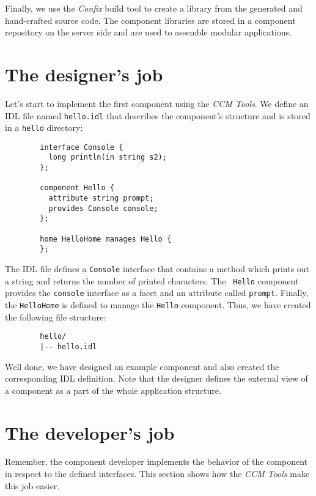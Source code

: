 Finally, we use the {\it Confix} build tool to create a library from the
generated and hand-crafted source code. The component libraries are stored in a
component repository on the server side and are used to assemble modular
applications.


\section{The designer's job}

Let's start to implement the first component using the {\it CCM Tools}. We
define an IDL file named {\tt hello.idl} that describes the component's
structure and is stored in a {\tt hello} directory:
\begin{verbatim}
        interface Console {
          long println(in string s2);
        };

        component Hello {
          attribute string prompt;	
          provides Console console;
        };

        home HelloHome manages Hello {
        };
\end{verbatim}

The IDL file defines a {\tt Console} interface that contains a method which
prints out a string and returns the number of printed characters. The {\tt
Hello} component provides the {\tt console} interface as a facet and an
attribute called {\tt prompt}. Finally, the {\tt HelloHome} is defined to manage
the {\tt Hello} component. Thus, we have created the following file structure:
\begin{verbatim}
        hello/
        |-- hello.idl
\end{verbatim}

Well done, we have designed an example component and also created the
corresponding IDL definition. Note that the designer defines the external view
of a component as a part of the whole application structure.



\section{The developer's job}

Remember, the component developer implements the behavior of the component in
respect to the defined interfaces. This section shows how the {\it CCM Tools}
make this job easier.

